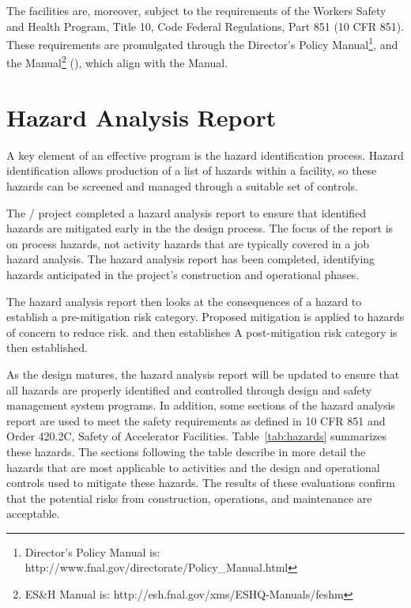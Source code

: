 The \fnal facilities are, moreover, subject to the requirements of the
 Workers Safety and Health Program, Title 10, Code Federal
Regulations, Part 851 (10 CFR 851). These requirements are
promulgated through the \fnal Director's Policy Manual\footnote{\fnal
  Director's Policy Manual is:
  http://www.fnal.gov/directorate/Policy\_Manual.html}, and the \fnal
{} Manual\footnote{\fnal ES\&H Manual is:
  http://esh.fnal.gov/xms/ESHQ-Manuals/feshm} (), which align with
the \surf {} Manual.

\section{Hazard Analysis Report}

A key element of an effective  program is the hazard
identification process. Hazard identification allows production of a
list of hazards within a facility, so these hazards can be screened
and managed through a suitable set of controls.

The / project completed a hazard analysis
report to ensure that identified hazards are mitigated early in the
the design process.  The focus of the report is on process hazards,
not activity hazards that are typically covered in a job hazard
analysis.  The hazard analysis report has been completed, identifying
hazards anticipated in the project's construction and operational
phases.

The hazard analysis report then looks at the consequences of a hazard
to establish a pre-mitigation risk category. Proposed mitigation is
applied to hazards of concern to reduce risk. and then establishes A
post-mitigation risk category is then established.

As the  design matures, the hazard analysis report will be updated to ensure
that all hazards are properly identified and controlled through
design and safety management system programs.  In addition, some
sections of the hazard analysis report are used to meet the safety requirements as
defined in 10 CFR 851 and  Order 420.2C, Safety of
Accelerator Facilities.  Table~\ref{tab:hazards} summarizes these
hazards.  The sections following the table describe in more detail the hazards that
are most applicable to  activities and the
design and operational controls used to mitigate these hazards. The
results of these evaluations confirm that the potential risks from
construction, operations, and maintenance are acceptable.

